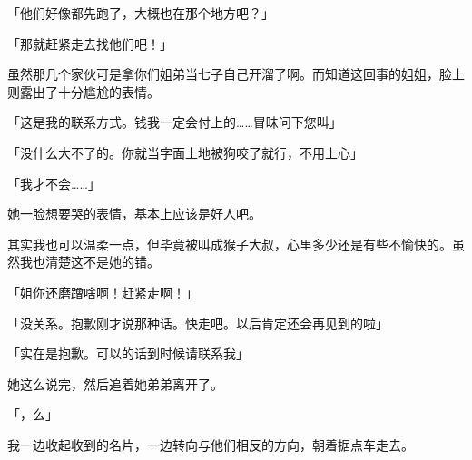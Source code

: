 「他们好像都先跑了，大概也在那个地方吧？」

「那就赶紧走去找他们吧！」

虽然那几个家伙可是拿你们姐弟当七子自己开溜了啊。而知道这回事的姐姐，脸上则露出了十分尴尬的表情。

「这是我的联系方式。钱我一定会付上的……冒昧问下您叫」

「没什么大不了的。你就当字面上地被狗咬了就行，不用上心」

「我才不会……」

她一脸想要哭的表情，基本上应该是好人吧。

其实我也可以温柔一点，但毕竟被叫成猴子大叔，心里多少还是有些不愉快的。虽然我也清楚这不是她的错。

「姐你还磨蹭啥啊！赶紧走啊！」

「没关系。抱歉刚才说那种话。快走吧。以后肯定还会再见到的啦」

「实在是抱歉。可以的话到时候请联系我」

她这么说完，然后追着她弟弟离开了。

「，么」

我一边收起收到的名片，一边转向与他们相反的方向，朝着据点车走去。
